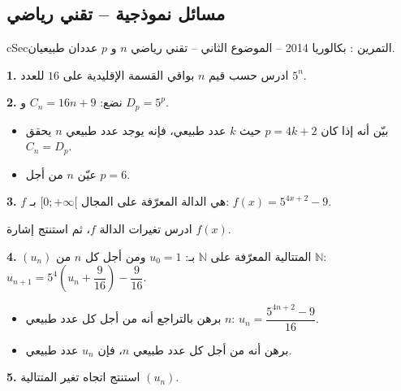 \documentclass[12pt,a4paper]{article}
\newenvironment{BOX}[2]{\begin{otherlanguage}{english}\begin{arbox}{#1}{#2}}{\end{arbox}\end{otherlanguage}}
\newcounter{exo}
\newenvironment{tamrin}[1]{\stepcounter{exo}\begin{BOX}{cSec}{التمرين \theexo: #1}}{\end{BOX}}
\newcommand{\N}{\mathbb{N}}
\newenvironment{sq}{\begin{itemize}[leftmargin=2.4em,itemsep=3pt]}{\end{itemize}}
\newcommand{\qa}{\item[(أ)]}\newcommand{\qb}{\item[(ب)]}\newcommand{\qc}{\item[(جـ)]}\newcommand{\qd}{\item[(د)]}\newcommand{\qe}{\item[(هـ)]}
\newcommand{\QQ}[1]{\par\smallskip\textbf{#1.} }
\begin{document}

\subsection{مسائل نموذجية -- تقني رياضي}
\begin{tamrin}{بكالوريا 2014 -- الموضوع الثاني -- تقني رياضي}
$n$ و $p$ عددان طبيعيان.

\QQ{1} ادرس حسب قيم $n$ بواقي القسمة الإقليدية على $16$ للعدد $5^n$.

\QQ{2} نضع: $C_n=16n+9$ و $D_p=5^p$.
\begin{sq}
\qa بيّن أنه إذا كان $p=4k+2$ حيث $k$ عدد طبيعي، فإنه يوجد عدد طبيعي $n$ يحقق $C_n=D_p$.
\qb عيّن $n$ من أجل $p=6$.
\end{sq}

\QQ{3} $f$ هي الدالة المعرّفة على المجال $[0;+\infty[$ بـ: $f(x)=5^{4x+2}-9$.

ادرس تغيرات الدالة $f$، ثم استنتج إشارة $f(x)$.

\QQ{4} $(u_n)$ المتتالية المعرّفة على $\N$ بـ: $u_0=1$ ومن أجل كل $n$ من $\N$: $u_{n+1}=5^4\left(u_n+\dfrac{9}{16}\right)-\dfrac{9}{16}$.
\begin{sq}
\qa برهن بالتراجع أنه من أجل كل عدد طبيعي $n$: $u_n=\dfrac{5^{4n+2}-9}{16}$.
\qb برهن أنه من أجل كل عدد طبيعي $n$، فإن $u_n$ عدد طبيعي.
\end{sq}

\QQ{5} استنتج اتجاه تغير المتتالية $(u_n)$.
\end{tamrin}
\end{document}
